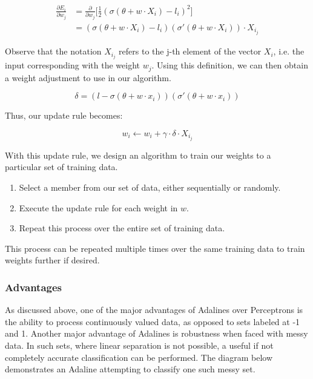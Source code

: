\documentclass[a4paper, 11pt]{article} %
\begin{document}
\begin{equation}
\begin{split}
\frac{\partial E_i}{\partial w_j} & = \frac{\partial }{\partial w_j} \Big[\frac{1}{2}(\sigma (\theta + w \cdot X_i) - l_i)^2 \Big] \\
 & = (\sigma (\theta + w \cdot X_i) - l_i)(\sigma '(\theta + w \cdot X_i)) \cdot X_{i_j}
\end{split}
\end{equation}

Observe that the notation ${X_{i_j}}$ refers to the j-th element of the vector $X_i$, i.e. the input corresponding with the weight $w_j$.  Using this definition, we can then obtain a weight adjustment to use in our algorithm.

\begin{equation}
\delta = (l - \sigma (\theta + w \cdot x_i))(\sigma '(\theta + w \cdot x_i))
\end{equation}

Thus, our update rule becomes:

\begin{equation}
w_i \leftarrow w_i + \gamma \cdot \delta \cdot X_{i_j}
\end{equation}

With this update rule, we design an algorithm to train our weights to a particular set of training data.

\begin{enumerate}
	\item Select a member from our set of data, either sequentially or randomly.
	\item Execute the update rule for each weight in $w$.
	\item Repeat this process over the entire set of training data.
\end{enumerate}

This process can be repeated multiple times over the same training data to train weights further if desired.

\subsubsection*{Advantages}

As discussed above, one of the major advantages of Adalines over Perceptrons is the ability to process continuously valued data, as opposed to sets labeled at -1 and 1.  Another major advantage of Adalines is robustness when faced with messy data.  In such sets, where linear separation is not possible, a useful if not completely accurate classification can be performed.  The diagram below demonstrates an Adaline attempting to classify one such messy set.
\end{document}
